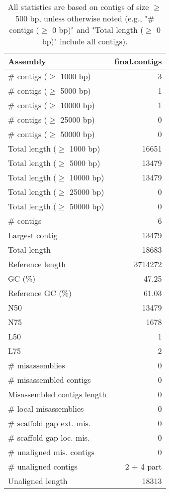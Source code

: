 \documentclass[12pt,a4paper]{article}
\begin{document}
\begin{table}[ht]
\begin{center}
\caption{All statistics are based on contigs of size $\geq$ 500 bp, unless otherwise noted (e.g., "\# contigs ($\geq$ 0 bp)" and "Total length ($\geq$ 0 bp)" include all contigs).}
\begin{tabular}{|l*{1}{|r}|}
\hline
Assembly & final.contigs \\ \hline
\# contigs ($\geq$ 1000 bp) & 3 \\ \hline
\# contigs ($\geq$ 5000 bp) & 1 \\ \hline
\# contigs ($\geq$ 10000 bp) & 1 \\ \hline
\# contigs ($\geq$ 25000 bp) & 0 \\ \hline
\# contigs ($\geq$ 50000 bp) & 0 \\ \hline
Total length ($\geq$ 1000 bp) & 16651 \\ \hline
Total length ($\geq$ 5000 bp) & 13479 \\ \hline
Total length ($\geq$ 10000 bp) & 13479 \\ \hline
Total length ($\geq$ 25000 bp) & 0 \\ \hline
Total length ($\geq$ 50000 bp) & 0 \\ \hline
\# contigs & 6 \\ \hline
Largest contig & 13479 \\ \hline
Total length & 18683 \\ \hline
Reference length & 3714272 \\ \hline
GC (\%) & 47.25 \\ \hline
Reference GC (\%) & 61.03 \\ \hline
N50 & 13479 \\ \hline
N75 & 1678 \\ \hline
L50 & 1 \\ \hline
L75 & 2 \\ \hline
\# misassemblies & 0 \\ \hline
\# misassembled contigs & 0 \\ \hline
Misassembled contigs length & 0 \\ \hline
\# local misassemblies & 0 \\ \hline
\# scaffold gap ext. mis. & 0 \\ \hline
\# scaffold gap loc. mis. & 0 \\ \hline
\# unaligned mis. contigs & 0 \\ \hline
\# unaligned contigs & 2 + 4 part \\ \hline
Unaligned length & 18313 \\ \hline

\end{tabular}
\end{center}
\end{table}
\end{document}
